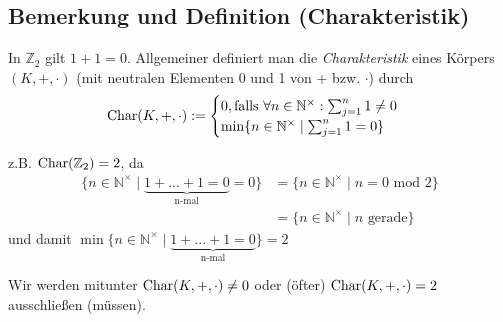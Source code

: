 \subsection{Bemerkung und Definition (Charakteristik)}
	\begin{Definition}[Charakteristik]
		In $\mathbb{Z}_2$ gilt $1 + 1 = 0$. Allgemeiner definiert man die \emph{Charakteristik} eines Körpers $(K,+,\cdot)$ (mit neutralen Elementen 0 und 1 von + bzw. $\cdot$) durch
                \begin{equation*}
                        \operatorname{Char}(K,+,\cdot):=
                        \begin{cases}
                                0,\text{falls } \forall n \in \mathbb{N}^\times: \sum_{j = 1}^{n} 1 \neq 0\\
                                \min\{n \in \mathbb{N}^\times\mid \sum_{j = 1}^{n} 1 = 0\}
                        \end{cases}
                \end{equation*}
	\end{Definition}
	z.B. $\operatorname{Char}(\mathbb{Z}_2) = 2$, da
	\begin{align*}
		\{n\in\mathbb{N}^\times\mid \underbrace{1+...+1=0}_{\text{n-mal}}=0\}
		&=\{n\in\mathbb{N}^\times\mid n=0 \text{ mod } 2\}\\
		&=\{n\in\mathbb{N}^\times\mid n \text{ gerade}\}
        \end{align*}
        und damit $\min\{n\in\mathbb{N}^\times\mid \underbrace{1+...+1=0}_{\text{n-mal}}\}=2$
	
	Wir werden mitunter $\operatorname{Char}(K,+,\cdot)\neq 0$ oder (öfter) $\operatorname{Char}(K,+,\cdot)=2$ ausschließen (müssen).

